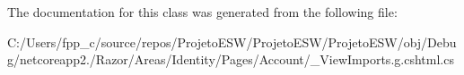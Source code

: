The documentation for this class was generated from the following file\+:\begin{DoxyCompactItemize}
\item 
C\+:/\+Users/fpp\+\_\+c/source/repos/\+Projeto\+E\+S\+W/\+Projeto\+E\+S\+W/\+Projeto\+E\+S\+W/obj/\+Debug/netcoreapp2./\+Razor/\+Areas/\+Identity/\+Pages/\+Account/\+\_\+\+View\+Imports.\+g.\+cshtml.\+cs\end{DoxyCompactItemize}
